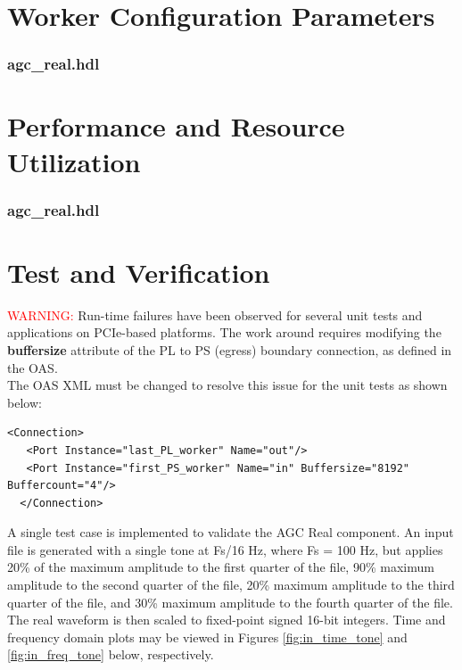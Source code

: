 \documentclass{article}
\def\comp{agc\_real}
\edef\ecomp{agc_real}
\begin{document}
\begin{landscape}
\section*{Worker Configuration Parameters}
\subsubsection*{\comp.hdl}

\section*{Performance and Resource Utilization}
\subsubsection*{\comp.hdl}

\end{landscape}
\section*{Test and Verification}

\noindent\textcolor{red}{WARNING:}
Run-time failures have been observed for several unit tests and applications on PCIe-based platforms. The work around requires modifying the \textbf{buffersize} attribute of the PL to PS (egress) boundary connection, as defined in the OAS. \\
The OAS XML must be changed to resolve this issue for the unit tests as shown below:\\
\begin{lstlisting}[showspaces=false]
  <Connection>
   <Port Instance="last_PL_worker" Name="out"/>
   <Port Instance="first_PS_worker" Name="in" Buffersize="8192" Buffercount="4"/>
  </Connection>
\end{lstlisting}

\begin{flushleft}
	A single test case is implemented to validate the AGC Real component. An input file is generated with a single tone at Fs/16 Hz, where Fs = 100 Hz, but applies 20\% of the maximum amplitude to the first quarter of the file, 90\% maximum amplitude to the second quarter of the file, 20\% maximum amplitude to the third quarter of the file, and 30\% maximum amplitude to the fourth quarter of the file. The real waveform is then scaled to fixed-point signed 16-bit integers. Time and frequency domain plots may be viewed in Figures \ref{fig:in_time_tone} and \ref{fig:in_freq_tone} below, respectively.
\end{flushleft}
\end{document}
